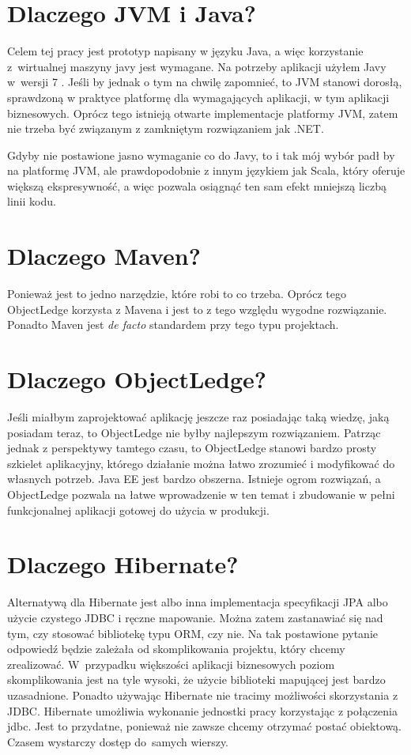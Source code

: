 \documentclass[a4paper,onecolumn,oneside,11pt,wide,floatssmall]{mwrep}
\theoremstyle{definition}
\theoremstyle{plain}%
\theoremstyle{remark}
\begin{document}
\section{Dlaczego JVM i Java?}
Celem tej pracy jest prototyp napisany w języku Java, a więc korzystanie \mbox{z wirtualnej} maszyny 
javy jest wymagane. Na potrzeby aplikacji użyłem Javy \mbox{w wersji} 7 \cite{java7seHome}.
Jeśli by jednak o tym na chwilę zapomnieć, to JVM stanowi dorosłą, sprawdzoną w praktyce platformę dla wymagających 
aplikacji, w tym aplikacji biznesowych. Oprócz tego istnieją otwarte implementacje platformy JVM, zatem nie trzeba być 
związanym z zamkniętym rozwiązaniem jak .NET.

Gdyby nie postawione jasno wymaganie co do Javy, to i tak mój wybór padł by na platformę JVM, ale prawdopodobnie z 
innym językiem jak Scala\cite{scalaLangHome}, który oferuje większą ekspresywność, a więc pozwala osiągnąć ten sam efekt mniejszą liczbą linii kodu.

\section{Dlaczego Maven?}
Ponieważ jest to jedno narzędzie, które robi to co trzeba. Oprócz tego ObjectLedge korzysta z Mavena i jest to z tego względu wygodne rozwiązanie. Ponadto Maven jest \emph{de facto} standardem przy tego typu projektach.

\section{Dlaczego ObjectLedge?}
Jeśli miałbym zaprojektować aplikację jeszcze raz posiadając taką wiedzę, jaką posiadam teraz, to ObjectLedge nie byłby najlepszym rozwiązaniem. Patrząc jednak z perspektywy tamtego czasu, to ObjectLedge stanowi bardzo prosty szkielet aplikacyjny, którego działanie można łatwo zrozumieć i modyfikować do własnych potrzeb. Java EE jest bardzo obszerna. Istnieje ogrom rozwiązań, a ObjectLedge pozwala na łatwe wprowadzenie w ten temat i zbudowanie w pełni funkcjonalnej aplikacji gotowej do użycia w produkcji.

\section{Dlaczego Hibernate?}
Alternatywą dla Hibernate jest albo inna implementacja specyfikacji JPA albo użycie czystego JDBC i ręczne mapowanie. Można zatem zastanawiać się nad tym, czy stosować bibliotekę typu ORM, czy nie. Na tak postawione pytanie odpowiedź będzie zależała od skomplikowania projektu, który chcemy zrealizować. \mbox{W przypadku} większości aplikacji biznesowych poziom skomplikowania jest na tyle wysoki, że użycie biblioteki mapującej jest bardzo uzasadnione. Ponadto używając Hibernate nie tracimy możliwości skorzystania z JDBC. Hibernate umożliwia wykonanie jednostki pracy korzystając z połączenia jdbc. Jest to przydatne, ponieważ nie zawsze chcemy otrzymać postać obiektową. Czasem wystarczy dostęp \mbox{do samych} wierszy.
\end{document}
